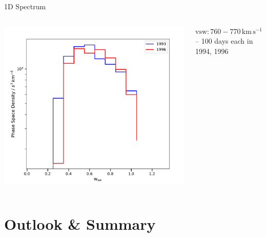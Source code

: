 \documentclass{beamer}
\begin{document}
\begin{frame}{1D Spectrum}
\begin{columns}
	
	\includegraphics[scale=.38]{Pics/1D.pdf}
	
	\vspace{-0.1cm}
	\begin{center}
		{\tiny $\mathrm{vsw}:760 - 770 \, \mathrm{km\,s^{-1}}$ --
			100 days each in 1994, 1996}
	\end{center}
	\column{4cm}
\end{columns}


\end{frame}



\section{Outlook \& Summary}
\end{document}
